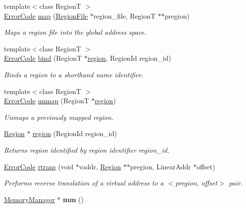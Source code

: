\begin{DoxyCompactItemize}
\item 
{\footnotesize template$<$class RegionT $>$ }\\\hyperlink{group__ERRORCODES_ga6263a3c9a0b8d36aea21cdd835ac99fe}{Error\+Code} \hyperlink{classalps_1_1AddressSpace_a91628b6c9afb5796c4745d10d721c7df}{map} (\hyperlink{classalps_1_1RegionFile}{Region\+File} $\ast$region\+\_\+file, RegionT $\ast$$\ast$pregion)
\begin{DoxyCompactList}\small\item\em Maps a region file into the global address space. \end{DoxyCompactList}\item 
{\footnotesize template$<$class RegionT $>$ }\\\hyperlink{group__ERRORCODES_ga6263a3c9a0b8d36aea21cdd835ac99fe}{Error\+Code} \hyperlink{classalps_1_1AddressSpace_a94f33857ada089b1fb35bb7b3efc22f0}{bind} (RegionT $\ast$\hyperlink{classalps_1_1AddressSpace_a3f32659a01f535e8b787556c08270a68}{region}, Region\+Id region\+\_\+id)
\begin{DoxyCompactList}\small\item\em Binds a region to a shorthand name identifier. \end{DoxyCompactList}\item 
{\footnotesize template$<$class RegionT $>$ }\\\hyperlink{group__ERRORCODES_ga6263a3c9a0b8d36aea21cdd835ac99fe}{Error\+Code} \hyperlink{classalps_1_1AddressSpace_a23441f4279dbbf6f9d6fdb7da5c0626a}{unmap} (RegionT $\ast$\hyperlink{classalps_1_1AddressSpace_a3f32659a01f535e8b787556c08270a68}{region})
\begin{DoxyCompactList}\small\item\em Unmaps a previously mapped region. \end{DoxyCompactList}\item 
\hyperlink{classalps_1_1Region}{Region} $\ast$ \hyperlink{classalps_1_1AddressSpace_a3f32659a01f535e8b787556c08270a68}{region} (Region\+Id region\+\_\+id)
\begin{DoxyCompactList}\small\item\em Returns region identified by region identifier {\itshape region\+\_\+id}. \end{DoxyCompactList}\item 
\hyperlink{group__ERRORCODES_ga6263a3c9a0b8d36aea21cdd835ac99fe}{Error\+Code} \hyperlink{classalps_1_1AddressSpace_ae9c5ec2ca94b68aa80643676c3029de0}{rtrans} (void $\ast$vaddr, \hyperlink{classalps_1_1Region}{Region} $\ast$$\ast$pregion, Linear\+Addr $\ast$offset)
\begin{DoxyCompactList}\small\item\em Performs reverse translation of a virtual address to a $<${\itshape pregion}, {\itshape offset$>$} pair. \end{DoxyCompactList}\item 
\hyperlink{classalps_1_1MemoryManager}{Memory\+Manager} $\ast$ {\bfseries mm} ()\hypertarget{classalps_1_1AddressSpace_ac250b1b2b365f21f489a99e36122c679}{}\label{classalps_1_1AddressSpace_ac250b1b2b365f21f489a99e36122c679}

\end{DoxyCompactItemize}
